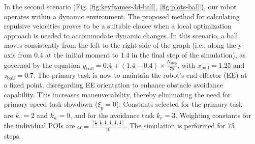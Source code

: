 \documentclass[letterpaper, 10 pt, conference]{ieeeconf}  %
\begin{document}
In the second scenario (Fig. \ref{fig:keyframes-3d-ball}, \ref{fig:plots-ball}), our robot operates within a dynamic environment. The proposed method for calculating repulsive velocities proves to be a suitable choice when a local optimization approach is needed to accommodate dynamic changes. In this scenario, a ball moves consistently from the left to the right side of the graph (i.e., along the y-axis from 0.4 at the initial moment to 1.4 in the final step of the simulation), as governed by the equation \( y_{\text{ball}} = 0.4 + (1.4 - 0.4) \times \frac{N_{\text{step}}}{75} \),  with \( x_{\text{ball}} = 1.25 \) and \( z_{\text{ball}} = 0.7 \). The primary task is now to maintain the robot's end-effector (EE) at a fixed point, disregarding EE orientation to enhance obstacle avoidance capability. This increases maneuverability, thereby eliminating the need for primary speed task slowdown (\( \xi_{p} = 0 \)). Constants selected for the primary task are \( k_v = 2 \) and \( k_w = 0 \), and for the avoidance task \( k_r = 3 \). Weighting constants for the individual POIs are \( \alpha = \frac{[ \frac{1}{5}, \frac{1}{5}, \frac{1}{5}, \frac{1}{5}, \frac{1}{5}, \frac{1}{5} ]}{10} \). The simulation is performed for 75 steps. 
\end{document}
